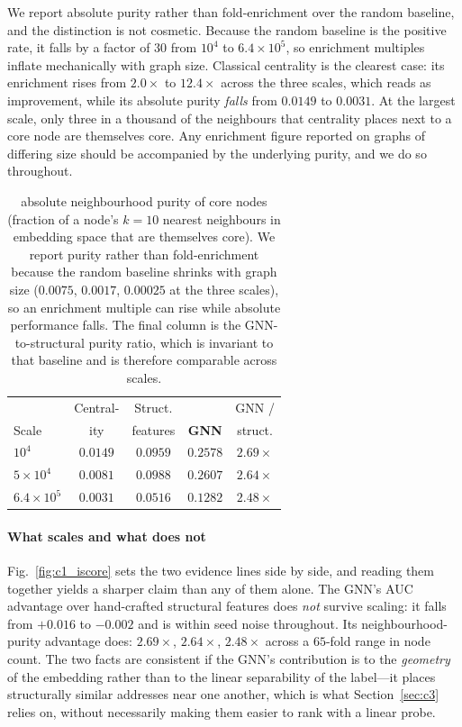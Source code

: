 \documentclass[final,5p,times]{elsarticle}
\begin{document}
We report absolute purity rather than fold-enrichment over the random
baseline, and the distinction is not cosmetic. Because the random baseline
is the positive rate, it falls by a factor of $30$ from $10^4$ to
$6.4\times10^5$, so enrichment multiples inflate mechanically with graph
size. Classical centrality is the clearest case: its enrichment rises from
$2.0\times$ to $12.4\times$ across the three scales, which reads as
improvement, while its absolute purity \emph{falls} from $0.0149$ to
$0.0031$. At the largest scale, only three in a thousand of the neighbours
that centrality places next to a core node are themselves core. Any
enrichment figure reported on graphs of differing size should be
accompanied by the underlying purity, and we do so throughout.

\begin{table}[H]
\centering\small
\caption{absolute neighbourhood purity of core nodes
(fraction of a node's $k=10$ nearest neighbours in embedding space that are
themselves core). We report purity rather than fold-enrichment because the
random baseline shrinks with graph size ($0.0075$, $0.0017$, $0.00025$ at
the three scales), so an enrichment multiple can rise while absolute
performance falls. The final column is the GNN-to-structural purity ratio,
which is invariant to that baseline and is therefore comparable across
scales.}
\label{tab:c1_enrich}
\setlength{\tabcolsep}{4pt}
\begin{tabular}{@{}lcccc@{}}
\toprule
      & Central- & Struct.  &              & GNN /   \\
Scale & ity      & features & \textbf{GNN} & struct. \\
\midrule
$10^4$          & $0.0149$ & $0.0959$ & $\mathbf{0.2578}$ & $2.69\times$ \\
$5\times10^4$   & $0.0081$ & $0.0988$ & $\mathbf{0.2607}$ & $2.64\times$ \\
$6.4\times10^5$ & $0.0031$ & $0.0516$ & $\mathbf{0.1282}$ & $2.48\times$ \\
\bottomrule
\end{tabular}
\end{table}



\paragraph{What scales and what does not}
Fig.~\ref{fig:c1_iscore} sets the two evidence lines side by side, and
reading them together yields a sharper claim than any of them alone. The GNN's AUC advantage over hand-crafted structural
features does \emph{not} survive scaling: it falls from $+0.016$ to
$-0.002$ and is within seed noise throughout. Its neighbourhood-purity
advantage does: $2.69\times$, $2.64\times$, $2.48\times$ across a $65$-fold
range in node count. The two facts are consistent if the GNN's contribution
is to the \emph{geometry} of the embedding rather than to the linear
separability of the label---it places structurally similar addresses near
one another, which is what Section~\ref{sec:c3} relies on, without
necessarily making them easier to rank with a linear probe.
\end{document}
